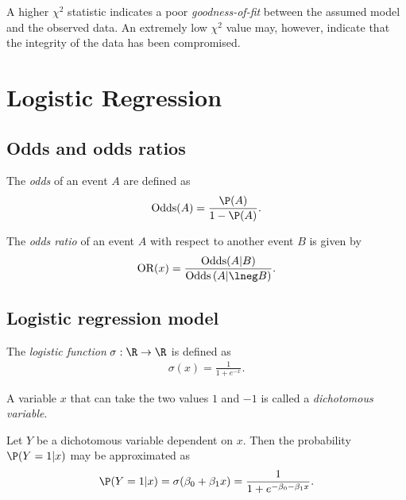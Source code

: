 \documentclass{article}
\begin{document}
\begin{theorem}
	A higher $\chi^2$ statistic indicates a poor \emph{goodness-of-fit}
	between the assumed model and the observed data. An extremely low
	$\chi^2$ value may, however, indicate that the integrity of the data
	has been compromised.
\end{theorem}


\section{Logistic Regression}


\subsection{Odds and odds ratios}

\begin{definition}
	The \emph{odds} of an event $A$ are defined as
	\begin{align*}
		\text{Odds}(A) = \frac{\P(A)}{1-\P(A)}.
	\end{align*}
\end{definition}

\begin{definition}
	The \emph{odds ratio} of an event $A$ with respect to another event
	$B$ is given by 
	\begin{align*}
		\text{OR}(x) = \frac{\text{Odds}(A|B)}{\text{Odds}\left(A|\lneg B\right)}.
	\end{align*}
\end{definition}

\subsection{Logistic regression model}

\begin{definition}
	The \emph{logistic function} $\sigma:\R\to\R$ is defined as
	\begin{align*}
		\sigma(x) = \frac{1}{1+e^{-x}}.	
	\end{align*}
\end{definition}

\begin{definition}
	A variable $x$ that can take the two values $1$ and $-1$ is called a
	\emph{dichotomous variable}.
\end{definition}

\begin{theorem}
	Let $Y$ be a dichotomous variable dependent on $x$. Then the probability
	$\P(Y=1|x)$ may be approximated as
	\begin{align*}
		\P(Y=1|x)=\sigma(\beta_0+\beta_1 x) = \frac{1}{1+e^{-\beta_0-\beta_1 x}}.	
	\end{align*}
\end{theorem}
\end{document}
